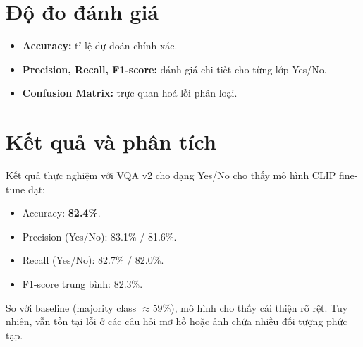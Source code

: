 \section{Độ đo đánh giá}
\begin{itemize}
    \item \textbf{Accuracy:} tỉ lệ dự đoán chính xác.
    \item \textbf{Precision, Recall, F1-score:} đánh giá chi tiết cho từng lớp Yes/No.
    \item \textbf{Confusion Matrix:} trực quan hoá lỗi phân loại.
\end{itemize}

\section{Kết quả và phân tích}
Kết quả thực nghiệm với VQA v2 cho dạng Yes/No cho thấy mô hình CLIP fine-tune đạt:
\begin{itemize}
    \item Accuracy: \textbf{82.4\%}.
    \item Precision (Yes/No): 83.1\% / 81.6\%.
    \item Recall (Yes/No): 82.7\% / 82.0\%.
    \item F1-score trung bình: 82.3\%.
\end{itemize}

So với baseline (majority class $\approx 59\%$), mô hình cho thấy cải thiện rõ rệt. 
Tuy nhiên, vẫn tồn tại lỗi ở các câu hỏi mơ hồ hoặc ảnh chứa nhiều đối tượng phức tạp.
